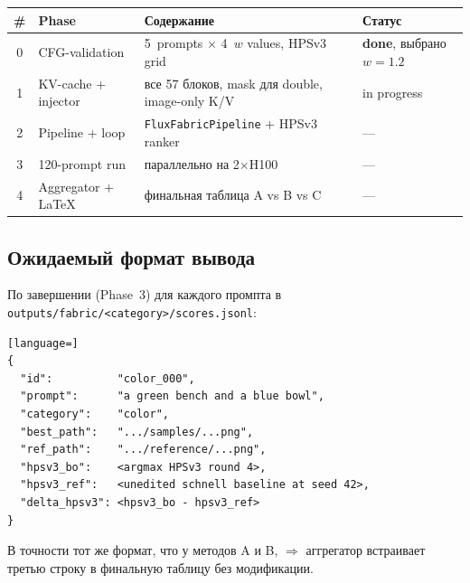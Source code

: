 \documentclass[11pt,a4paper]{article}
\begin{document}
\begin{center}
\begin{tabular}{clll}
\toprule
\# & Phase & Содержание & Статус \\
\midrule
0 & CFG-validation     & 5~prompts $\times$ 4~$w$ values, HPSv3 grid  & \textbf{done}, выбрано $w=1.2$ \\
1 & KV-cache + injector & все 57 блоков, mask для double, image-only K/V & in progress \\
2 & Pipeline + loop    & \texttt{FluxFabricPipeline} + HPSv3 ranker      & --- \\
3 & 120-prompt run     & параллельно на 2$\times$H100                    & --- \\
4 & Aggregator + LaTeX & финальная таблица A vs B vs C                   & --- \\
\bottomrule
\end{tabular}
\end{center}

\subsection{Ожидаемый формат вывода}

По завершении (Phase~3) для каждого промпта в
\texttt{outputs/fabric/<category>/scores.jsonl}:
\begin{lstlisting}[language=]
{
  "id":          "color_000",
  "prompt":      "a green bench and a blue bowl",
  "category":    "color",
  "best_path":   ".../samples/...png",
  "ref_path":    ".../reference/...png",
  "hpsv3_bo":    <argmax HPSv3 round 4>,
  "hpsv3_ref":   <unedited schnell baseline at seed 42>,
  "delta_hpsv3": <hpsv3_bo - hpsv3_ref>
}
\end{lstlisting}
В точности тот же формат, что у методов A и B, $\Rightarrow$ аггрегатор
встраивает третью строку в финальную таблицу без модификации.
\end{document}
